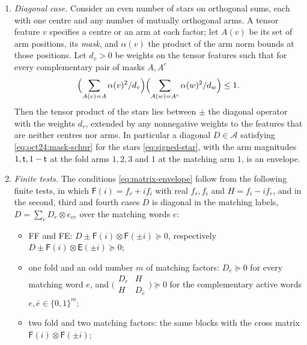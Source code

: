 \begin{lemma}
\begin{enumerate}[label=(\alph*)]
 diagonal of $D^\sharp$ and $G^{\rm fr}_X$ the Kronecker product of the matrix
 $G^{\rm fr}_F$ of the proof of \cref{lem:oct24:feature-block} at the fold factors and
 of the $3\times3$ matrix $G^{\rm fr}_E$ with unit diagonal and off-diagonal entries
 $1/(Q_3-1)$ at the matching factors.
\item \emph{Diagonal case.} Consider an even number of stars on orthogonal sums,
 each with one centre and any number of mutually orthogonal arms. A tensor
 feature $v$ specifies a centre or an arm at each factor; let $A(v)$ be its set of
 arm positions, its \emph{mask}, and $\alpha(v)$ the product of the arm norm bounds
 at those positions. Let $d_v>0$ be weights on the tensor features such that for
 every complementary pair of masks $A,A^c$
 \begin{equation}\label{eq:oct24:mask-schur}
  \Bigl(\sum_{A(v)=A}\frac{\alpha(v)^2}{d_v}\Bigr)
  \Bigl(\sum_{A(w)=A^c}\frac{\alpha(w)^2}{d_w}\Bigr)\le1 .
 \end{equation}
 Then the tensor product of the stars lies between $\pm$ the diagonal operator with
 the weights $d_v$, extended by any nonnegative weights to the features that are
 neither centres nor arms. In particular a diagonal $D\in\mathcal A$ satisfying
 \eqref{eq:oct24:mask-schur} for the stars \eqref{eq:signed-star}, with the arm
 magnitudes $1,\tlaw,1-\tlaw$ at the fold arms $1,2,3$ and $1$ at the matching arm
 $1$, is an envelope.
\item \emph{Finite tests.} The conditions \eqref{eq:matrix-envelope} follow from the
 following finite tests, in which $\mathsf F(i)=f_r+if_i$ with real $f_r,f_i$ and
 $H=f_i-if_r$, and in the second, third and fourth cases $D$ is diagonal in the
 matching labels, $D=\sum_eD_e\otimes e_{ee}$ over the matching words $e$:
 \begin{itemize}
 \item FF and FE: $D\pm\mathsf F(i)\otimes\mathsf F(\pm i)\succeq0$, respectively
  $D\pm\mathsf F(i)\otimes\mathsf E(\pm i)\succeq0$;
 \item one fold and an odd number $m$ of matching factors: $D_e\succeq0$ for every
  matching word $e$, and
  $\bigl(\begin{smallmatrix}D_e&H\\H&D_{\bar e}\end{smallmatrix}\bigr)\succeq0$ for the
  complementary active words $e,\bar e\in\{0,1\}^m$;
 \item two fold and two matching factors: the same blocks with the cross matrix
  $\mathsf F(i)\otimes\mathsf F(\pm i)$;

\end{itemize}
\end{enumerate}
\end{lemma}
